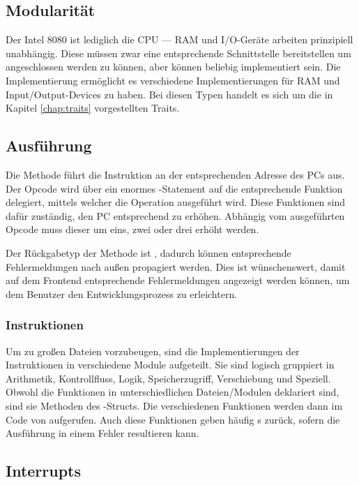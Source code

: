 \subsection{Modularität}

Der Intel 8080 ist lediglich die \ac{CPU} --- \ac{RAM} und I/O-Geräte arbeiten prinzipiell unabhängig. Diese müssen zwar eine entsprechende Schnittstelle bereitstellen um angeschlossen werden zu können, aber können beliebig implementiert sein. Die Implementierung ermöglicht es verschiedene Implementierungen für \ac{RAM} und Input/Output-Devices zu haben. Bei diesen Typen handelt es sich um die in Kapitel \ref{chap:traits} vorgestellten Traits.

\subsection{Ausführung}

Die Methode  führt die Instruktion an der entsprechenden Adresse des \ac{PC}s aus. Der Opcode wird über ein enormes -Statement auf die entsprechende Funktion delegiert, mittels welcher die Operation ausgeführt wird. Diese Funktionen sind dafür zuständig, den \ac{PC} entsprechend zu erhöhen. Abhängig vom ausgeführten Opcode muss dieser um eins, zwei oder drei erhöht werden.

Der Rückgabetyp der Methode ist , dadurch können entsprechende Fehlermeldungen nach außen propagiert werden. Dies ist wünschenswert, damit auf dem Frontend entsprechende Fehlermeldungen angezeigt werden können, um dem Benutzer den Entwicklungsprozess zu erleichtern.

\subsubsection{Instruktionen}

Um zu großen Dateien vorzubeugen, sind die Implementierungen der Instruktionen in verschiedene Module aufgeteilt. Sie sind logisch gruppiert in Arithmetik, Kontrollfluss, Logik, Speicherzugriff, Verschiebung und Speziell. Obwohl die Funktionen in unterschiedlichen Dateien/Modulen deklariert sind, sind sie Methoden des -Structs. Die verschiedenen Funktionen werden dann im Code von  aufgerufen. Auch diese Funktionen geben häufig s zurück, sofern die Ausführung in einem Fehler resultieren kann.

\subsection{Interrupts}

